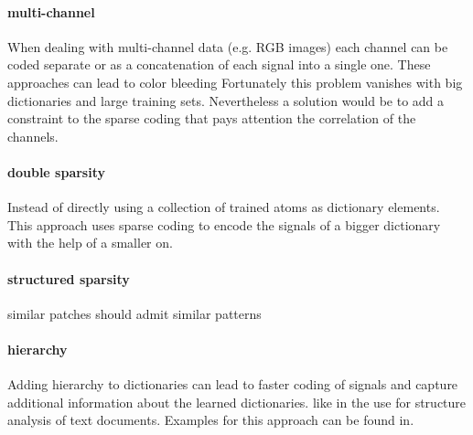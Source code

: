 
\paragraph{multi-channel}
When dealing with multi-channel data (e.g. RGB images) each channel can be coded
separate or as a concatenation of each signal into a single one. These
approaches can lead to color bleeding \cite{mairal08sparse} 
Fortunately this problem vanishes with big dictionaries and large training sets.
\cite{mairal08sparse} Nevertheless a solution would be to add a constraint to
the sparse coding that pays attention the correlation of the channels. 

\paragraph{double sparsity}
Instead of directly using a collection of trained atoms as dictionary
elements. This approach uses sparse coding to encode the signals of a bigger
dictionary with the help of a smaller on.\cite{Rubinstein2009} 

\paragraph{structured sparsity}
similar patches should admit similar patterns \cite{Mairal2009} 
\cite{group sparsity}

\paragraph{hierarchy}
Adding hierarchy to dictionaries can lead to faster coding of signals and
capture additional information about the learned dictionaries. like in the use
for structure analysis of text documents. Examples for this approach can be
found in\cite{Jenatton2010}.






